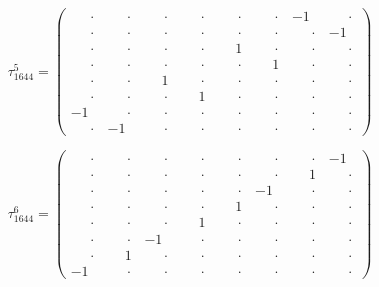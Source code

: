 \documentclass[
  10pt,
]{article}
\begin{document}
\[
\tau_{1644}^{5} = \left(\begin{array}{rrrr|rrrr}
\phantom{-}\cdot & \phantom{-}\cdot & \phantom{-}\cdot & \phantom{-}\cdot & \phantom{-}\cdot & \phantom{-}\cdot & -1 & \phantom{-}\cdot \\[-1.8pt]
\phantom{-}\cdot & \phantom{-}\cdot & \phantom{-}\cdot & \phantom{-}\cdot & \phantom{-}\cdot & \phantom{-}\cdot & \phantom{-}\cdot & -1 \\[-1.8pt]
\phantom{-}\cdot & \phantom{-}\cdot & \phantom{-}\cdot & \phantom{-}\cdot & \phantom{-}1 & \phantom{-}\cdot & \phantom{-}\cdot & \phantom{-}\cdot \\[-1.8pt]
\phantom{-}\cdot & \phantom{-}\cdot & \phantom{-}\cdot & \phantom{-}\cdot & \phantom{-}\cdot & \phantom{-}1 & \phantom{-}\cdot & \phantom{-}\cdot \\[-1.8pt]
\hline
\phantom{-}\cdot & \phantom{-}\cdot & \phantom{-}1 & \phantom{-}\cdot & \phantom{-}\cdot & \phantom{-}\cdot & \phantom{-}\cdot & \phantom{-}\cdot \\[-1.8pt]
\phantom{-}\cdot & \phantom{-}\cdot & \phantom{-}\cdot & \phantom{-}1 & \phantom{-}\cdot & \phantom{-}\cdot & \phantom{-}\cdot & \phantom{-}\cdot \\[-1.8pt]
-1 & \phantom{-}\cdot & \phantom{-}\cdot & \phantom{-}\cdot & \phantom{-}\cdot & \phantom{-}\cdot & \phantom{-}\cdot & \phantom{-}\cdot \\[-1.8pt]
\phantom{-}\cdot & -1 & \phantom{-}\cdot & \phantom{-}\cdot & \phantom{-}\cdot & \phantom{-}\cdot & \phantom{-}\cdot & \phantom{-}\cdot
\end{array}\right)
\]

\[
\tau_{1644}^{6} = \left(\begin{array}{rrrr|rrrr}
\phantom{-}\cdot & \phantom{-}\cdot & \phantom{-}\cdot & \phantom{-}\cdot & \phantom{-}\cdot & \phantom{-}\cdot & \phantom{-}\cdot & -1 \\[-1.8pt]
\phantom{-}\cdot & \phantom{-}\cdot & \phantom{-}\cdot & \phantom{-}\cdot & \phantom{-}\cdot & \phantom{-}\cdot & \phantom{-}1 & \phantom{-}\cdot \\[-1.8pt]
\phantom{-}\cdot & \phantom{-}\cdot & \phantom{-}\cdot & \phantom{-}\cdot & \phantom{-}\cdot & -1 & \phantom{-}\cdot & \phantom{-}\cdot \\[-1.8pt]
\phantom{-}\cdot & \phantom{-}\cdot & \phantom{-}\cdot & \phantom{-}\cdot & \phantom{-}1 & \phantom{-}\cdot & \phantom{-}\cdot & \phantom{-}\cdot \\[-1.8pt]
\hline
\phantom{-}\cdot & \phantom{-}\cdot & \phantom{-}\cdot & \phantom{-}1 & \phantom{-}\cdot & \phantom{-}\cdot & \phantom{-}\cdot & \phantom{-}\cdot \\[-1.8pt]
\phantom{-}\cdot & \phantom{-}\cdot & -1 & \phantom{-}\cdot & \phantom{-}\cdot & \phantom{-}\cdot & \phantom{-}\cdot & \phantom{-}\cdot \\[-1.8pt]
\phantom{-}\cdot & \phantom{-}1 & \phantom{-}\cdot & \phantom{-}\cdot & \phantom{-}\cdot & \phantom{-}\cdot & \phantom{-}\cdot & \phantom{-}\cdot \\[-1.8pt]
-1 & \phantom{-}\cdot & \phantom{-}\cdot & \phantom{-}\cdot & \phantom{-}\cdot & \phantom{-}\cdot & \phantom{-}\cdot & \phantom{-}\cdot
\end{array}\right)
\]
\end{document}
